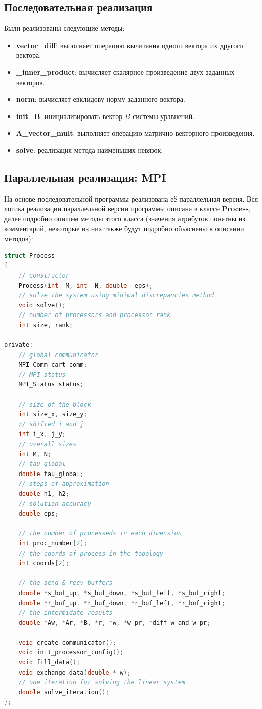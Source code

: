 \documentclass{article}
\begin{document}
\subsection{Последовательная реализация}
Были реализованы следующие методы:
\begin{itemize}
    \item \textbf{vector\_diff}: выполняет операцию вычитания одного вектора их другого вектора.
    \item \textbf{\_inner\_product}: вычисляет скалярное произведение двух заданных векторов.
    \item \textbf{norm}: вычисляет евклидову норму заданного вектора.
    \item \textbf{init\_B}: инициализировать вектор $B$ системы уравнений.
    \item \textbf{A\_vector\_mult}: выполняет операцию матрично-векторного произведения. 
    \item \textbf{solve}: реализация метода наименьших невязок.
\end{itemize}

\subsection{Параллельная реализация: MPI}
На основе последовательной программы реализована её параллельная версия. Вся логика реализации параллельной версии программы описана в классе \textbf{Process}, далее подробно опишем методы этого класса (значения атрибутов понятны из комментарий, некоторые из них также будут подробно объяснены в описании методов): 
\begin{lstlisting}[language=C, caption=Структура Process]
struct Process
{
    // constructor 
    Process(int _M, int _N, double _eps);
    // solve the system using minimal discrepancies method
    void solve();
    // number of processors and processor rank
    int size, rank;
    
private:
    // global communicator
    MPI_Comm cart_comm;
    // MPI status
    MPI_Status status;

    // size of the block
    int size_x, size_y;
    // shifted i and j 
    int i_x, j_y;
    // overall sizes
    int M, N;
    // tau global
    double tau_global;
    // steps of approximation
    double h1, h2;
    // solution accuracy 
    double eps;

    // the number of processeds in each dimension
    int proc_number[2];
    // the coords of process in the topology
    int coords[2];

    // the send & recv buffers 
    double *s_buf_up, *s_buf_down, *s_buf_left, *s_buf_right;
    double *r_buf_up, *r_buf_down, *r_buf_left, *r_buf_right;
    // the intermidate results
    double *Aw, *Ar, *B, *r, *w, *w_pr, *diff_w_and_w_pr;

    void create_communicator();
    void init_processor_config();
    void fill_data();
    void exchange_data(double *_w);
    // one iteration for solving the linear system
    double solve_iteration();
};
\end{lstlisting}
\end{document}
